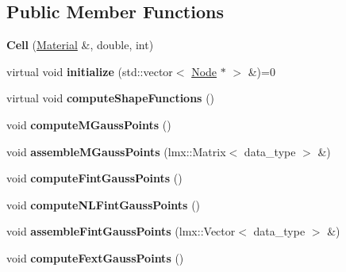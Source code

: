 \subsection*{Public Member Functions}
\begin{CompactItemize}
\item 
\hypertarget{classmknix_1_1Cell_388c9370182f98c5bb06e81c1b11b4b3}{
\textbf{Cell} (\hyperlink{classmknix_1_1Material}{Material} \&, double, int)}
\label{classmknix_1_1Cell_388c9370182f98c5bb06e81c1b11b4b3}

\item 
\hypertarget{classmknix_1_1Cell_d187b0ab3e1965166bff48711ee9d223}{
virtual void \textbf{initialize} (std::vector$<$ \hyperlink{classmknix_1_1Node}{Node} $\ast$ $>$ \&)=0}
\label{classmknix_1_1Cell_d187b0ab3e1965166bff48711ee9d223}

\item 
\hypertarget{classmknix_1_1Cell_6772f09fe6965faff4b53486b09f7235}{
virtual void \textbf{computeShapeFunctions} ()}
\label{classmknix_1_1Cell_6772f09fe6965faff4b53486b09f7235}

\item 
\hypertarget{classmknix_1_1Cell_32a01eb5f854fc23353c0eb64b65e2da}{
void \textbf{computeMGaussPoints} ()}
\label{classmknix_1_1Cell_32a01eb5f854fc23353c0eb64b65e2da}

\item 
\hypertarget{classmknix_1_1Cell_0b44063103766cd26b0411156c6d6004}{
void \textbf{assembleMGaussPoints} (lmx::Matrix$<$ data\_\-type $>$ \&)}
\label{classmknix_1_1Cell_0b44063103766cd26b0411156c6d6004}

\item 
\hypertarget{classmknix_1_1Cell_1c3123f613acd57332a6e84dc3736b86}{
void \textbf{computeFintGaussPoints} ()}
\label{classmknix_1_1Cell_1c3123f613acd57332a6e84dc3736b86}

\item 
\hypertarget{classmknix_1_1Cell_84014b9ed9c8a49c604f4ddb91b524fe}{
void \textbf{computeNLFintGaussPoints} ()}
\label{classmknix_1_1Cell_84014b9ed9c8a49c604f4ddb91b524fe}

\item 
\hypertarget{classmknix_1_1Cell_1bf285b7dd7f06ece2f92e2b4389d6f5}{
void \textbf{assembleFintGaussPoints} (lmx::Vector$<$ data\_\-type $>$ \&)}
\label{classmknix_1_1Cell_1bf285b7dd7f06ece2f92e2b4389d6f5}

\item 
\hypertarget{classmknix_1_1Cell_19b4ed719612fe2e0043d0cebcbe1537}{
void \textbf{computeFextGaussPoints} ()}
\label{classmknix_1_1Cell_19b4ed719612fe2e0043d0cebcbe1537}


\end{CompactItemize}

